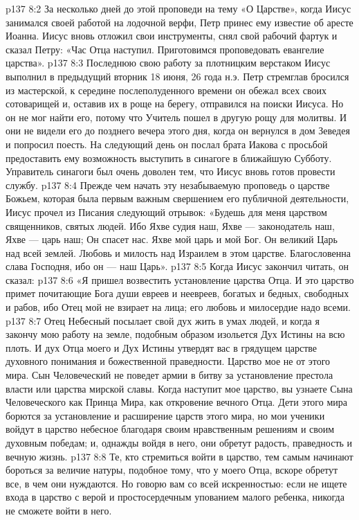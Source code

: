\vs p137 8:2 За несколько дней до этой проповеди на тему «О Царстве», когда Иисус занимался своей работой на лодочной верфи, Петр принес ему известие об аресте Иоанна. Иисус вновь отложил свои инструменты, снял свой рабочий фартук и сказал Петру: «Час Отца наступил. Приготовимся проповедовать евангелие царства».
\vs p137 8:3 Последнюю свою работу за плотницким верстаком Иисус выполнил в предыдущий вторник 18 июня, 26 года н.э. Петр стремглав бросился из мастерской, к середине послеполуденного времени он обежал всех своих сотоварищей и, оставив их в роще на берегу, отправился на поиски Иисуса. Но он не мог найти его, потому что Учитель пошел в другую рощу для молитвы. И они не видели его до позднего вечера этого дня, когда он вернулся в дом Зеведея и попросил поесть. На следующий день он послал брата Иакова с просьбой предоставить ему возможность выступить в синагоге в ближайшую Субботу. Управитель синагоги был очень доволен тем, что Иисус вновь готов провести службу.
\vs p137 8:4 \pc Прежде чем начать эту незабываемую проповедь о царстве Божьем, которая была первым важным свершением его публичной деятельности, Иисус прочел из Писания следующий отрывок: «Будешь для меня царством священников, святых людей. Ибо Яхве судия наш, Яхве --- законодатель наш, Яхве --- царь наш; Он спасет нас. Яхве мой царь и мой Бог. Он великий Царь над всей землей. Любовь и милость над Израилем в этом царстве. Благословенна слава Господня, ибо он --- наш Царь».
\vs p137 8:5 Когда Иисус закончил читать, он сказал:
\vs p137 8:6 \pc «Я пришел возвестить установление царства Отца. И это царство примет почитающие Бога души евреев и неевреев, богатых и бедных, свободных и рабов, ибо Отец мой не взирает на лица; его любовь и милосердие надо всеми.
\vs p137 8:7 Отец Небесный посылает свой дух жить в умах людей, и когда я закончу мою работу на земле, подобным образом изольется Дух Истины на всю плоть. И дух Отца моего и Дух Истины утвердят вас в грядущем царстве духовного понимания и божественной праведности. Царство мое не от этого мира. Сын Человеческий не поведет армии в битву за установление престола власти или царства мирской славы. Когда наступит мое царство, вы узнаете Сына Человеческого как Принца Мира, как откровение вечного Отца. Дети этого мира борются за установление и расширение царств этого мира, но мои ученики войдут в царство небесное благодаря своим нравственным решениям и своим духовным победам; и, однажды войдя в него, они обретут радость, праведность и вечную жизнь.
\vs p137 8:8 Те, кто стремиться войти в царство, тем самым начинают бороться за величие натуры, подобное тому, что у моего Отца, вскоре обретут все, в чем они нуждаются. Но говорю вам со всей искренностью: если не ищете входа в царство с верой и простосердечным упованием малого ребенка, никогда не сможете войти в него.
